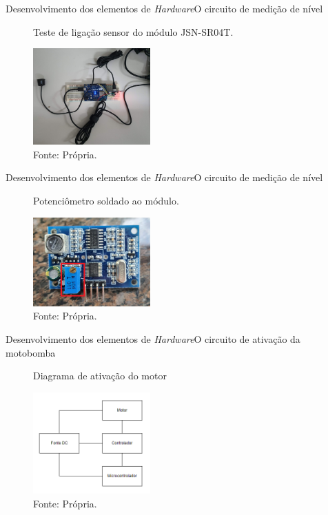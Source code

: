 \begin{frame}{Desenvolvimento dos elementos de \textit{Hardware}}{O circuito de medição de nível}
  \begin{figure}[H]
    \centering
    \caption{Teste de ligação sensor do módulo JSN-SR04T.}
    \includegraphics[width=0.4\textwidth]{figuras/teste_ultrassonico.jpg}
    \caption*{\tiny{Fonte: Própria.}}
    \label{fig:sensor_ultrassonico}
  \end{figure}
  
\end{frame}

\begin{frame}{Desenvolvimento dos elementos de \textit{Hardware}}{O circuito de medição de nível}
  \begin{figure}[H]
    \centering
    \caption{Potenciômetro soldado ao módulo.}
    \includegraphics[width=0.4\textwidth]{figuras/ultrassonico_res.jpg}
    \caption*{\tiny{Fonte: Própria.}}
    \label{fig:ultrasonico_res}
  \end{figure}
  
\end{frame}

\begin{frame}{Desenvolvimento dos elementos de \textit{Hardware}}{O circuito de ativação da motobomba}
  \begin{figure}[H]
    \centering
    \caption{Diagrama de ativação do motor}
    \includegraphics[width=0.4\textwidth]{figuras/ativacao_motor.png}
    \caption*{\tiny{Fonte: Própria.}}
    \label{fig:diagrama_ativacao_motor}
  \end{figure}
\end{frame}

